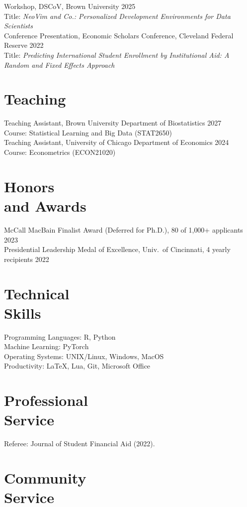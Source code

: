 \documentclass[margin,line]{res}
\begin{document}
\begin{resume}
Workshop, DSCoV, Brown University \hfill 2025 \\
Title: \textit{NeoVim and Co.: Personalized Development Environments for Data Scientists} \\ 
Conference Presentation, Economic Scholars Conference, Cleveland Federal Reserve \hfill 2022 \\ 
Title: \textit{Predicting International Student Enrollment by Institutional Aid: A Random and Fixed Effects Approach}

\section{\sc Teaching}
Teaching Assistant, Brown University Department of Biostatistics \hfill 2027 \\
Course: Statistical Learning and Big Data (STAT2650) \\[1mm]
Teaching Assistant, University of Chicago Department of Economics \hfill 2024 \\
Course: Econometrics (ECON21020)

\section{\sc Honors \\ and Awards}
McCall MacBain Finalist Award (Deferred for Ph.D.), 80 of 1{,}000+ applicants \hfill 2023 \\
Presidential Leadership Medal of Excellence, Univ.\ of Cincinnati, 4 yearly recipients \hfill 2022

\section{\sc Technical \\ Skills}
Programming Languages: R, Python \\
Machine Learning: PyTorch \\
Operating Systems: UNIX/Linux, Windows, MacOS \\
Productivity: \LaTeX, Lua, Git, Microsoft Office

\section{\sc Professional \\ Service}
Referee: Journal of Student Financial Aid (2022).

\section{\sc Community \\ Service}


\end{resume}
\end{document}
